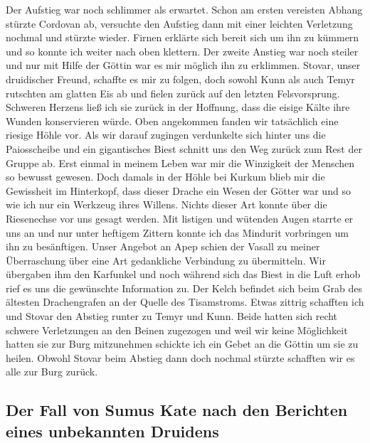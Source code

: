 Der Aufstieg war noch schlimmer als erwartet. Schon am ersten vereisten Abhang stürzte Cordovan ab, versuchte den Aufstieg dann mit einer leichten Verletzung nochmal und stürzte wieder. Firnen erklärte sich bereit sich um ihn zu kümmern und so konnte ich weiter nach oben klettern. Der zweite Anstieg war noch steiler und nur mit Hilfe der Göttin war es mir möglich ihn zu erklimmen. Stovar, unser druidischer Freund, schaffte es mir zu folgen, doch sowohl Kunn als auch Temyr rutschten am glatten Eis ab und fielen zurück auf den letzten Felsvorsprung. Schweren Herzens ließ ich sie zurück in der Hoffnung, dass die eisige Kälte ihre Wunden konservieren würde. Oben angekommen fanden wir tatsächlich eine riesige Höhle vor. Als wir darauf zugingen verdunkelte sich hinter uns die Paiosscheibe und ein gigantisches Biest schnitt uns den Weg zurück zum Rest der Gruppe ab. Erst einmal in meinem Leben war mir die Winzigkeit der Menschen so bewusst gewesen. Doch damals in der Höhle bei Kurkum blieb mir die Gewissheit im Hinterkopf, dass dieser Drache ein Wesen der Götter war und so wie ich nur ein Werkzeug ihres Willens. Nichts dieser Art konnte über die Riesenechse vor uns gesagt werden. Mit listigen und wütenden Augen starrte er uns an und nur unter heftigem Zittern konnte ich das Mindurit vorbringen um ihn zu besänftigen. Unser Angebot an Apep schien der Vasall zu meiner Überraschung über eine Art gedankliche Verbindung zu übermitteln. Wir übergaben ihm den Karfunkel und noch während sich das Biest in die Luft erhob rief es uns die gewünschte Information zu. Der Kelch befindet sich beim Grab des ältesten Drachengrafen an der Quelle des Tisamstroms. Etwas zittrig schafften ich und Stovar den Abstieg runter zu Temyr und Kunn. Beide hatten sich recht schwere Verletzungen an den Beinen zugezogen und weil wir keine Möglichkeit hatten sie zur Burg mitzunehmen schickte ich ein Gebet an die Göttin um sie zu heilen. Obwohl Stovar beim Abstieg dann doch nochmal stürzte schafften wir es alle zur Burg zurück.

\subsection{Der Fall von Sumus Kate nach den Berichten eines unbekannten Druidens}

